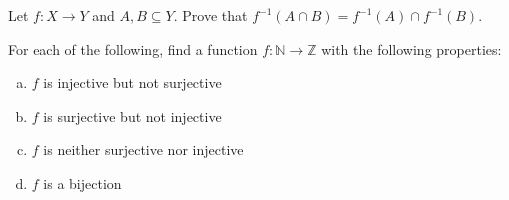 \documentclass[11pt,letterpaper]{article}
\begin{document}
\newpage





 Let $f: X \to Y$ and $A, B \subseteq Y$. Prove that $f^{-1}(A \cap B)= f^{-1}(A) \cap f^{-1}(B)$. 





\newpage





 For each of the following, find a function $f: \mathbb{N} \to \mathbb{Z}$ with the following properties:
\begin{enumerate}[(a)]
\item $f$ is injective but not surjective
\item $f$ is surjective but not injective
\item $f$ is neither surjective nor injective
\item $f$ is a bijection
\end{enumerate}
\end{document}
